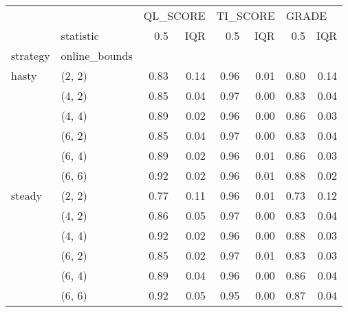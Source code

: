 \begin{tabular}{llrrrrrr}
\toprule
       & {} & \multicolumn{2}{l}{QL\_SCORE} & \multicolumn{2}{l}{TI\_SCORE} & \multicolumn{2}{l}{GRADE} \\
       & statistic &      0.5 &  IQR &      0.5 &  IQR &   0.5 &  IQR \\
strategy & online\_bounds &          &      &          &      &       &      \\
\midrule
hasty & (2, 2) &     0.83 & 0.14 &     0.96 & 0.01 &  0.80 & 0.14 \\
       & (4, 2) &     0.85 & 0.04 &     0.97 & 0.00 &  0.83 & 0.04 \\
       & (4, 4) &     0.89 & 0.02 &     0.96 & 0.00 &  0.86 & 0.03 \\
       & (6, 2) &     0.85 & 0.04 &     0.97 & 0.00 &  0.83 & 0.04 \\
       & (6, 4) &     0.89 & 0.02 &     0.96 & 0.01 &  0.86 & 0.03 \\
       & (6, 6) &     0.92 & 0.02 &     0.96 & 0.01 &  0.88 & 0.02 \\
steady & (2, 2) &     0.77 & 0.11 &     0.96 & 0.01 &  0.73 & 0.12 \\
       & (4, 2) &     0.86 & 0.05 &     0.97 & 0.00 &  0.83 & 0.04 \\
       & (4, 4) &     0.92 & 0.02 &     0.96 & 0.00 &  0.88 & 0.03 \\
       & (6, 2) &     0.85 & 0.02 &     0.97 & 0.01 &  0.83 & 0.03 \\
       & (6, 4) &     0.89 & 0.04 &     0.96 & 0.00 &  0.86 & 0.04 \\
       & (6, 6) &     0.92 & 0.05 &     0.95 & 0.00 &  0.87 & 0.04 \\
\bottomrule
\end{tabular}
